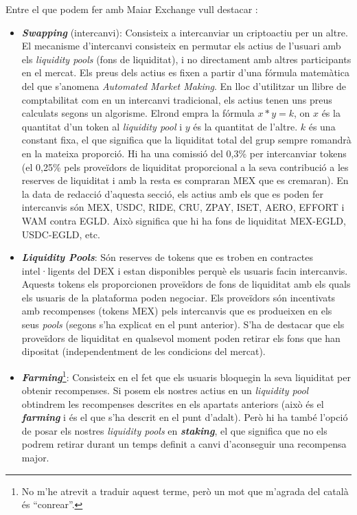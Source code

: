 \documentclass[11pt,a4paper]{article}
\begin{document}
Entre el que podem fer amb Maiar Exchange vull destacar \cite{everstake2021}\cite{elrond2021}:
\begin{itemize}
\item \textbf{\textit{Swapping}} (intercanvi): Consisteix a intercanviar un criptoactiu per un altre. El mecanisme d'intercanvi consisteix en permutar els actius de l'usuari amb els \textit{liquidity pools} (fons de liquiditat), i no directament amb altres participants en el mercat. Els preus dels actius es fixen a partir d'una fórmula matemàtica del que s'anomena \textit{Automated Market Making}. En lloc d'utilitzar un llibre de comptabilitat com en un intercanvi tradicional, els actius tenen uns preus calculats segons un algorisme. Elrond empra la fórmula \(x * y = k\), on \(x\) és la quantitat d'un token al \textit{liquidity pool} i \(y\) és la quantitat de l'altre. \(k\) és una constant fixa, el que significa que la liquiditat total del grup sempre romandrà en la mateixa proporció. Hi ha una comissió del 0,3\% per intercanviar tokens (el 0,25\% pels proveïdors de liquiditat proporcional a la seva contribució a les reserves de liquiditat i amb la resta es compraran MEX que es cremaran). En la data de redacció d'aquesta secció, els actius amb els que es poden fer intercanvis són MEX, USDC, RIDE, CRU, ZPAY, ISET, AERO, EFFORT i WAM contra  EGLD. Això significa que hi ha fons de liquiditat MEX-EGLD, USDC-EGLD, etc.
\item \textit{\textbf{Liquidity Pools}}:  Són reserves de tokens que es troben en contractes intel·ligents del DEX i estan disponibles perquè els usuaris facin intercanvis. Aquests tokens els proporcionen proveïdors de fons de liquiditat amb els quals els usuaris de la plataforma poden negociar. Els proveïdors són incentivats amb recompenses (tokens MEX) pels intercanvis que es produeixen en els seus \textit{pools} (segons s'ha explicat en el punt anterior). S'ha de destacar que els proveïdors de liquiditat en qualsevol moment poden retirar els fons que han dipositat (independentment de les condicions del mercat).  
\item \textit{\textbf{Farming}}\footnote{No m'he atrevit a traduir aquest terme, però un mot que m'agrada del català és ``conrear''.}: Consisteix en el fet que els usuaris bloquegin la seva liquiditat per obtenir recompenses. Si posem els nostres actius en un \textit{liquidity pool} obtindrem les recompenses descrites en els apartats anteriors (això és el \textit{\textbf{farming}} i és el que s'ha descrit en el punt d'adalt). Però hi ha també l'opció de posar els nostres \textit{liquidity pools} en \textit{\textbf{staking}}, el que significa que no els podrem retirar durant un temps definit a canvi d'aconseguir una recompensa major.
\end{itemize}
\end{document}
